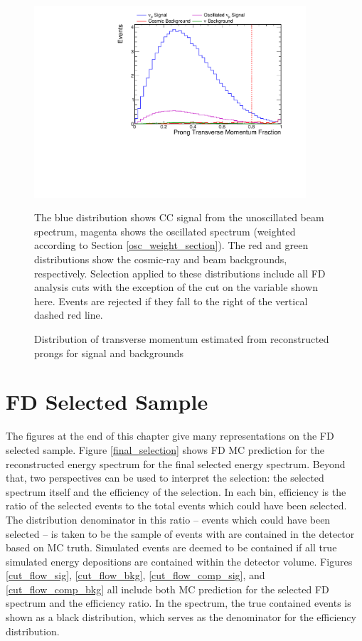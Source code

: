 \begin{figure}
\begin{center}
\includegraphics[width=0.9\textwidth]{figures/selection/n1_pngptp.pdf}
\end{center}
\caption{Distribution of transverse momentum estimated from reconstructed prongs
 for signal and backgrounds}{
The blue distribution shows \numu CC signal from the unoscillated beam spectrum,
magenta shows the oscillated spectrum (weighted according to Section
\ref{osc_weight_section}).
The red and green distributions show the cosmic-ray and beam backgrounds,
respectively.
Selection applied to these distributions include all FD analysis cuts
with the exception of the cut on the variable shown here.
Events are rejected if they fall to the right of the vertical
dashed red line.
}
\label{tranMom}
\end{figure}


\section{FD Selected Sample}
\label{fd_selection_section}

The figures at the end of this chapter give many representations on the
FD selected sample.
Figure \ref{final_selection} shows FD MC prediction for
the reconstructed energy spectrum for the final selected energy spectrum.
Beyond that, two perspectives can be used to interpret the selection:
the selected spectrum itself and the efficiency of the selection.
In each bin, efficiency is the ratio of the selected events
to the total events which could have been selected.
The distribution denominator in this ratio -- events which could have been
selected -- is taken to be the sample of events with are contained
in the detector based on MC truth.
Simulated events are deemed to be contained if all true simulated energy
depositions are contained within the detector volume.
Figures \ref{cut_flow_sig}, \ref{cut_flow_bkg}, \ref{cut_flow_comp_sig}, and
\ref{cut_flow_comp_bkg} all include both MC prediction for the selected
FD spectrum and the efficiency ratio.
In the spectrum, the true contained events is shown as a black distribution,
which serves as the denominator for the efficiency distribution.

